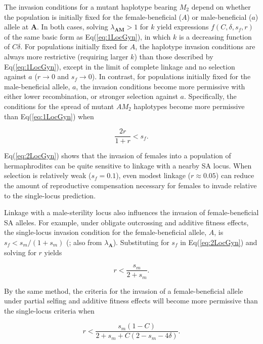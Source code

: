 \documentclass[9pt,twocolumn,twoside,lineno]{gsajnl}
\begin{document}
\noindent The invasion conditions for a mutant haplotype bearing $M_2$ depend on whether the population is initially fixed for the female-beneficial ($A$) or male-beneficial ($a$) allele at $\mathbf{A}$. In both cases, solving $\lambda_{\mathbf{AM}} > 1$ for $k$ yield expressions $f(C,\delta,s_f,r)$ of the same basic form as Eq(\ref{eq:1LocGyn}), in which $k$ is a decreasing function of $C \delta$. For populations initially fixed for $A$, the haplotype invasion conditions are always more restrictive (requiring larger $k$) than those described by Eq(\ref{eq:1LocGyn}), except in the limit of complete linkage and no selection against $a$ ($r \rightarrow 0$ and $s_f \rightarrow  0$). In contrast, for populations initially fixed for the male-beneficial allele, $a$, the invasion conditions become more permissive with either lower recombination, or stronger selection against $a$. Specifically, the conditions for the spread of mutant $AM_2$ haplotypes become more permissive than Eq(\ref{eq:1LocGyn}) when 

\begin{equation}\label{eq:2LocGyn}
	\frac{2 r}{1 + r} < s_f.
\end{equation}

\noindent Eq(\ref{eq:2LocGyn}) shows that the invasion of females into a population of hermaphrodites can be quite sensitive to linkage with a nearby SA locus. When selection is relatively weak ($s_f = 0.1$), even modest linkage ($r\approx0.05$) can reduce the amount of reproductive compensation necessary for females to invade relative to the single-locus prediction. 

Linkage with a male-sterility locus also influences the invasion of female-beneficial SA alleles. For example, under obligate outcrossing and additive fitness effects, the single-locus invasion condition for the female-beneficial allele, $A$, is $s_f < s_m / (1+s_m)$ (\citealt{Kidwell1977}; also from $\lambda_{\mathbf{A}}$). Substituting for $s_f$ in Eq(\ref{eq:2LocGyn}) and solving for $r$ yields

\begin{equation}\label{eq:2LocGynSA}
	r < \frac{s_m}{2 + s_m}.
\end{equation}

\noindent By the same method, the criteria for the invasion of a female-beneficial allele under partial selfing and additive fitness effects will become more permissive than the single-locus criteria when 

\begin{equation}\label{eq:2LocGynSApartSelf}
	r < \frac{s_m (1 - C)}{2 + s_m +C (2 - s_m - 4 \delta)}.
\end{equation}
\end{document}
